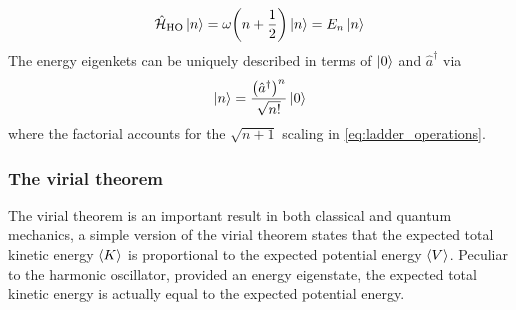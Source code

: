 \documentclass[nofootinbib,reprint,english]{revtex4-1}
\newcommand{\hatHH}{\hat{\mathcal{H}}}
\begin{document}
\begin{equation}\label{eq:harmonic_oscillator_energies}
\hatHH_\text{HO}\ket{n}=\omega\bigg(n+\frac{1}{2}\bigg)\ket{n}=E_n\ket{n}
\end{equation}
The energy eigenkets can be uniquely described in terms of \(\ket{0}\) and \(\hat{a}^\dagger\) via
\begin{equation}\label{eq:harmonic_oscillator_eigenkets}
\ket{n}=\frac{\big(\hat{a}^\dagger\big)^n}{\sqrt{n!}}\ket{0}
\end{equation}
where the factorial accounts for the \(\sqrt{n+1}\) scaling in \eqref{eq:ladder_operations}.

\subsubsection{The virial theorem}
The virial theorem is an important result in both classical and quantum mechanics, a simple version of the virial theorem states that the expected total kinetic energy \(\expval{K}\) is proportional to the expected potential energy \(\expval{V}\). Peculiar to the harmonic oscillator, provided an energy eigenstate, the expected total kinetic energy is actually equal to the expected potential energy.
\end{document}
